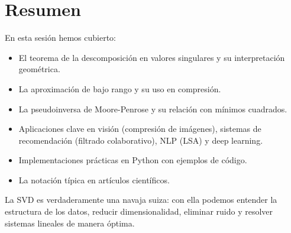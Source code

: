 \documentclass[12pt,a4paper,openany,oneside]{book}
\begin{document}
\section{Resumen}

En esta sesión hemos cubierto:
\begin{itemize}
    \item El teorema de la descomposición en valores singulares y su interpretación geométrica.
    \item La aproximación de bajo rango y su uso en compresión.
    \item La pseudoinversa de Moore-Penrose y su relación con mínimos cuadrados.
    \item Aplicaciones clave en visión (compresión de imágenes), sistemas de recomendación (filtrado colaborativo), NLP (LSA) y deep learning.
    \item Implementaciones prácticas en Python con ejemplos de código.
    \item La notación típica en artículos científicos.
\end{itemize}
La SVD es verdaderamente una navaja suiza: con ella podemos entender la estructura de los datos, reducir dimensionalidad, eliminar ruido y resolver sistemas lineales de manera óptima.
\end{document}
